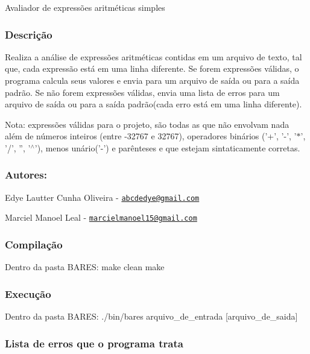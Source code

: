 Avaliador de expressões aritméticas simples

\subsubsection*{Descrição}

Realiza a análise de expressões aritméticas contidas em um arquivo de texto, tal que, cada expressão está em uma linha diferente. Se forem expressões válidas, o programa calcula seus valores e envia para um arquivo de saída ou para a saída padrão. Se não forem expressões válidas, envia uma lista de erros para um arquivo de saída ou para a saída padrão(cada erro está em uma linha diferente).

Nota\-: expressões válidas para o projeto, são todas as que não envolvam nada além de números inteiros (entre -\/32767 e 32767), operadores binários ('+', '-\/', '$\ast$', '/', '', '$^\wedge$'), menos unário('-\/') e parênteses e que estejam sintaticamente corretas.

\subsubsection*{Autores\-:}


\begin{DoxyItemize}
\item Edye Lautter Cunha Oliveira -\/ \href{mailto:abcdedye@gmail.com}{\tt abcdedye@gmail.\-com}
\item Marciel Manoel Leal -\/ \href{mailto:marcielmanoel15@gmail.com}{\tt marcielmanoel15@gmail.\-com}
\end{DoxyItemize}

\subsubsection*{Compilação}

Dentro da pasta B\-A\-R\-E\-S\-: make clean make

\subsubsection*{Execução}

Dentro da pasta B\-A\-R\-E\-S\-: ./bin/bares arquivo\-\_\-de\-\_\-entrada \mbox{[}arquivo\-\_\-de\-\_\-saida\mbox{]}

\subsubsection*{Lista de erros que o programa trata}

